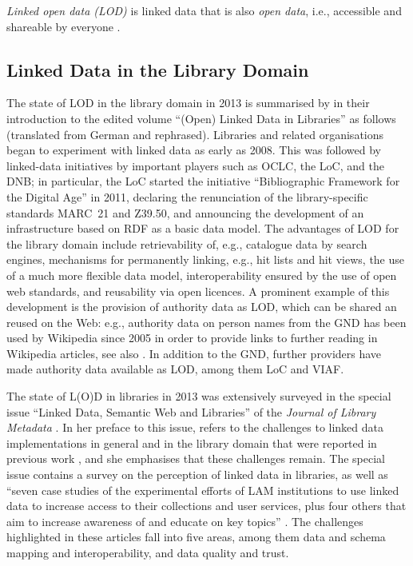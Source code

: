 \par\medskip
\emph{Linked open data (LOD)} is linked data that is also \emph{open data},
i.e., accessible and shareable by everyone \autocite{WikiLinkedData}.




\subsection{Linked Data in the Library Domain}

The state of LOD in the library domain in 2013 is summarised by \textcite{Pohl2013}
in their introduction to the edited volume \enquote{(Open) Linked Data in Libraries} \autocite{Danowski2013}
as follows (translated from German and rephrased). Libraries and related organisations
began to experiment with linked data as early as 2008.
This was followed by linked-data initiatives by important players such as
OCLC, the \gls{LoC}, and the \gls{DNB};
in particular, the \gls{LoC} started the initiative \enquote{Bibliographic Framework for the Digital Age} in 2011,
%
%
declaring the renunciation of the library-specific standards \gls{MARC}~21 and \gls{Z39.50},
and announcing the development of an infrastructure based on \gls{RDF} as a basic data model. The advantages of LOD for the library domain include
retrievability of, e.g., catalogue data by search engines,
mechanisms for permanently linking, e.g., hit lists and hit views,
the use of a much more flexible data model,
interoperability ensured by the use of open web standards,
and reusability via open licences.
A prominent example of this development is the provision of authority data as LOD,
which can be shared an reused on the Web:
e.g., authority data on person names from the \gls{GND} has been used by Wikipedia since 2005
in order to provide links to further reading in Wikipedia articles, see also \autocite{Hengel2005}.
In addition to the \gls{GND}, further providers have made authority data available as LOD,
among them \gls{LoC} and \gls{VIAF}.

The state of L(O)D in libraries in 2013 was extensively surveyed in the special issue
\enquote{Linked Data, Semantic Web and Libraries} of the \emph{Journal of Library Metadata} \autocite{JLM13_2-3}.
In her preface to this issue, \textcite{Bair2013} refers to the challenges to linked data implementations
in general and in the library domain that were reported in previous work
\autocite{Bizer2009,Byrne2010,Gonzalez2011,Alemu2012},
and she emphasises that these challenges remain.
The special issue contains a survey on the perception of linked data in libraries,
as well as
\enquote{seven case studies of the experimental efforts of LAM institutions to use linked data to increase access to their collections and user services, plus four others that aim to increase awareness of and educate on key topics} \autocite[p.76]{Bair2013}.
The challenges highlighted in these articles fall into five areas,
among them data and schema mapping and interoperability, and data quality and trust.

